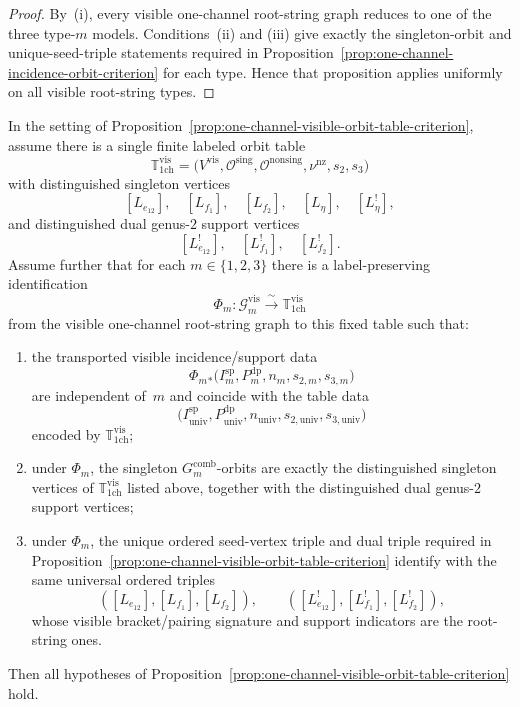 \begin{proof}
By~\textup{(i)}, every visible one-channel root-string graph reduces to
one of the three type-$m$ models.  Conditions~\textup{(ii)} and
\textup{(iii)} give exactly the singleton-orbit and unique-seed-triple
statements required in
Proposition~\ref{prop:one-channel-incidence-orbit-criterion} for each
type.  Hence that proposition applies uniformly on all visible
root-string types.
\end{proof}

\begin{proposition}\label{prop:one-channel-canonical-universal-orbit-table-criterion}
In the setting of
Proposition~\textup{\ref{prop:one-channel-visible-orbit-table-criterion}},
assume there is a single finite labeled orbit table
\[
\mathbb{T}_{\mathrm{1ch}}^{\mathrm{vis}}
=
\bigl(V^{\mathrm{vis}},\mathcal{O}^{\mathrm{sing}},
\mathcal{O}^{\mathrm{nonsing}},\nu^{\mathrm{nz}},s_2,s_3\bigr)
\]
with distinguished singleton vertices
\[
[L_{e_{12}}],\quad [L_{f_1}],\quad [L_{f_2}],\quad [L_{\eta}],\quad
[L_{\eta}^!],
\]
and distinguished dual genus-$2$ support vertices
\[
[L_{e_{12}}^!],\quad [L_{f_1}^!],\quad [L_{f_2}^!].
\]
Assume further that for each
$m\in\{1,2,3\}$ there is a label-preserving identification
\[
\Phi_m\colon \mathcal{G}_m^{\mathrm{vis}}
\xrightarrow{\ \sim\ }
\mathbb{T}_{\mathrm{1ch}}^{\mathrm{vis}}
\]
from the visible one-channel root-string graph to this fixed table such
that:
\begin{enumerate}[label=\textup{(\roman*)}]
\item the transported visible incidence/support data
\[
\Phi_m{}_*\bigl(I_m^{\mathrm{sp}},P_m^{\mathrm{dp}},n_m,s_{2,m},s_{3,m}\bigr)
\]
are independent of~$m$ and coincide with the table data
\[
\bigl(I^{\mathrm{sp}}_{\mathrm{univ}},P^{\mathrm{dp}}_{\mathrm{univ}},
n_{\mathrm{univ}},s_{2,\mathrm{univ}},s_{3,\mathrm{univ}}\bigr)
\]
encoded by $\mathbb{T}_{\mathrm{1ch}}^{\mathrm{vis}}$;
\item under $\Phi_m$, the singleton
$G_m^{\mathrm{comb}}$-orbits are exactly the distinguished singleton
vertices of $\mathbb{T}_{\mathrm{1ch}}^{\mathrm{vis}}$ listed above,
together with the distinguished dual genus-$2$ support vertices;
\item under $\Phi_m$, the unique ordered seed-vertex triple and dual
triple required in
Proposition~\textup{\ref{prop:one-channel-visible-orbit-table-criterion}}
identify with the same universal ordered triples
\[
([L_{e_{12}}],[L_{f_1}],[L_{f_2}]),
\qquad
([L_{e_{12}}^!],[L_{f_1}^!],[L_{f_2}^!]),
\]
whose visible bracket/pairing signature and support indicators are the
root-string ones.
\end{enumerate}
Then all hypotheses of
Proposition~\ref{prop:one-channel-visible-orbit-table-criterion} hold.


\end{proposition}
